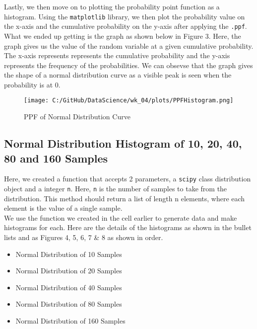 \documentclass[a4paper,twocolumn]{article}
\begin{document}
Lastly, we then move on to plotting the probability point function as a histogram. Using the 
\texttt{matplotlib} library, we then plot the probability value on the x-axis and the cumulative probability on 
the y-axis after applying the \texttt{.ppf}. \\

What we ended up getting is the graph as shown below in Figure 3. Here, the graph gives us the value of the 
random variable at a given cumulative probability. The x-axis represents represents the cumulative probability
and the y-axis represents the frequency of the probabilities. We can obsevse that the graph gives the shape of a
normal distribution curve as a visible peak is seen when the probability is at 0.

\begin{figure}[htbp] 
    \centering
    \noindent
    \texttt{[image: C:/GitHub/DataScience/wk\_04/plots/PPFHistogram.png]}
    \caption{PPF of Normal Distribution Curve} 
\end{figure}

\subsection{Normal Distribution Histogram of 10, 20, 40, 80 and 160 Samples}
Here, we created a function that accepts 2 parameters, a \texttt{scipy} class distribution object and a integer 
\texttt{n}. Here, \texttt{n} is the number of samples to take from the distribution. This method should return a 
list of length n elements, where each element is the value of a single sample. \\

We use the function we created in the cell earlier to generate data and make histograms for each. Here are the 
details of the histograms as shown in the bullet lists and as Figures 4, 5, 6, 7 \& 8 as shown in order.

\begin{itemize}
    \item Normal Distribution of 10 Samples
    \item Normal Distribution of 20 Samples
    \item Normal Distribution of 40 Samples
    \item Normal Distribution of 80 Samples
    \item Normal Distribution of 160 Samples
\end{itemize}

\newpage
\end{document}
